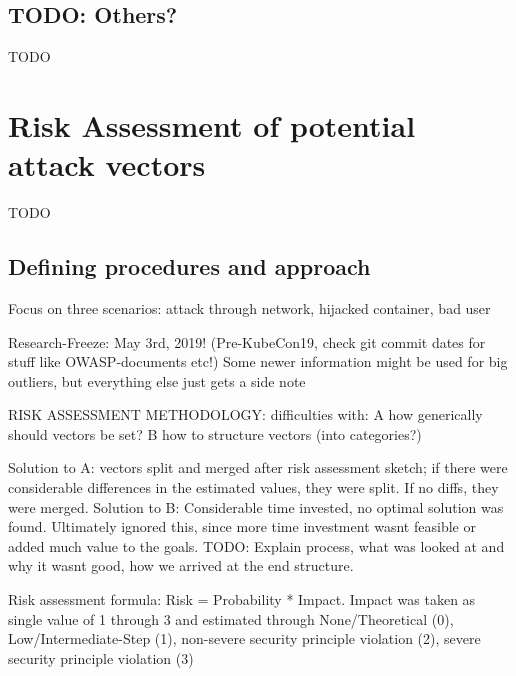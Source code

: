 \section{TODO: Others?}
TODO

\chapter{Risk Assessment of potential attack vectors}
TODO

\section{Defining procedures and approach}
Focus on three scenarios: attack through network, hijacked container, bad user

Research-Freeze: May 3rd, 2019! (Pre-KubeCon19, check git commit dates for stuff like OWASP-documents etc!)
Some newer information might be used for big outliers, but everything else just gets a side note

RISK ASSESSMENT METHODOLOGY:
difficulties with: 
A how generically should vectors be set?
B how to structure vectors (into categories?) 

Solution to A: vectors split and merged after risk assessment sketch; if there were considerable differences in the estimated values, they were split. If no diffs, they were merged.
Solution to B: Considerable time invested, no optimal solution was found. Ultimately ignored this, since more time investment wasnt feasible or added much value to the goals. TODO: Explain process, what was looked at and why it wasnt good, how we arrived at the end structure.

Risk assessment formula:
Risk = Probability * Impact.
Impact was taken as single value of 1 through 3  and estimated through None/Theoretical (0), Low/Intermediate-Step (1), non-severe security principle violation (2), severe security principle violation (3)

